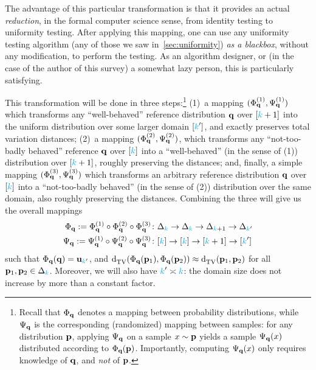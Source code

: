 The advantage of this particular transformation is that it provides an actual \emph{reduction}, in the formal computer science sense, from identity testing to uniformity testing. After applying this mapping, one can use any uniformity testing algorithm (\eg any of those we saw in~\cref{sec:uniformity}) \emph{as a blackbox}, without any modification, to perform the testing. As an algorithm designer, or (in the case of the author of this survey) a somewhat lazy person, this is particularly satisfying.

This transformation will be done in three steps:\footnote{Recall that $\Phi_{\mathbf{q}}$ denotes a mapping between probability distributions, while $\Psi_{\mathbf{q}}$ is the corresponding (randomized) mapping between samples: for any distribution $\mathbf{p}$, applying $\Psi_{\mathbf{q}}$ on a sample $x\sim\mathbf{p}$ yields a sample $\Psi_{\mathbf{q}}(x)$ distributed according to $\Phi_{\mathbf{q}}(\mathbf{p})$. Importantly, computing $\Psi_{\mathbf{q}}(x)$ only requires knowledge of $\mathbf{q}$, and \emph{not} of $\mathbf{p}$.} (1)~a mapping $(\Phi^{(1)}_{\mathbf{q}},\Psi^{(1)}_{\mathbf{q}})$ which transforms any ``well-behaved'' reference distribution $\mathbf{q}$ over $[{\textcolor{cyan}{k}}+1]$ into the uniform distribution over some larger domain $[{\textcolor{cyan}{k}}']$, and exactly preserves total variation distances; (2)~a mapping $(\Phi^{(2)}_{\mathbf{q}},\Psi^{(2)}_{\mathbf{q}})$, which transforms any ``not-too-badly behaved'' reference $\mathbf{q}$ over $[{\textcolor{cyan}{k}}]$ into a ``well-behaved'' (in the sense of (1)) distribution over $[{\textcolor{cyan}{k}}+1]$, roughly preserving the distances; and, finally, a simple mapping $(\Phi^{(3)}_{\mathbf{q}},\Psi^{(3)}_{\mathbf{q}})$ which transforms an arbitrary reference distribution $\mathbf{q}$ over $[{\textcolor{cyan}{k}}]$ into a ``not-too-badly behaved'' (in the sense of (2)) distribution over the same domain, also roughly preserving the distances. Combining the three will give us the overall mappings
\begin{equation}
	\label{eq:l1:reduction:composition}
	\begin{aligned}
		\Phi_{\mathbf{q}}:= \Phi^{(1)}_{\mathbf{q}}\circ\Phi^{(2)}_{\mathbf{q}}\circ\Phi^{(3)}_{\mathbf{q}} &\colon \Delta_{{\textcolor{cyan}{k}}} \to\Delta_{{\textcolor{cyan}{k}}} \to\Delta_{{\textcolor{cyan}{k}}+1} \to \Delta_{{\textcolor{cyan}{k}}'} \\
		\Psi_{\mathbf{q}}:= \Psi^{(1)}_{\mathbf{q}}\circ\Psi^{(2)}_{\mathbf{q}}\circ\Psi^{(3)}_{\mathbf{q}} &\colon [{\textcolor{cyan}{k}}] \to[{\textcolor{cyan}{k}}] \to[{\textcolor{cyan}{k}}+1] \to [{\textcolor{cyan}{k}}']
	\end{aligned}
\end{equation}
such that $\Phi_{\mathbf{q}}(\mathbf{q})=\mathbf{u}_{ {\textcolor{cyan}{k}}' } $, and $\totalvardist{\Phi_\q(\p_1)}{\Phi_\q(\p_2)} \approx \totalvardist{\p_1}{\p_2}$ for all $\mathbf{p}_1,\mathbf{p}_2\in\Delta_{{\textcolor{cyan}{k}}}$. Moreover, we will also have ${\textcolor{cyan}{k}}'\asymp{\textcolor{cyan}{k}}$: the domain size does not increase by more than a constant factor.

